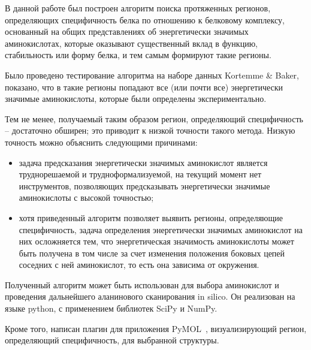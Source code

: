 \conclusion
В данной работе был построен алгоритм поиска протяженных регионов, определяющих специфичность белка по отношению к белковому комплексу, основанный на общих представлениях об энергетически значимых аминокислотах, которые оказывают существенный вклад в функцию, стабильность или форму белка, и тем самым формируют такие регионы. 

Было проведено тестирование алгоритма на наборе данных Kortemme \& Baker, показано, что в такие регионы попадают все (или почти все) энергетически значимые аминокислоты, которые были определены экспериментально.

Тем не менее, получаемый таким образом регион, определяющий специфичность -- достаточно обширен; это приводит к низкой  точности такого метода. Низкую точность можно объяснить следующими причинами:
\begin{itemize}
\item задача предсказания энергетически значимых аминокислот является труднорешаемой и трудноформализуемой, на текущий момент нет  инструментов, позволяющих предсказывать энергетически значимые аминокислоты с высокой точностью; 
\item хотя приведенный алгоритм позволяет выявить регионы, определяющие специфичность, задача определения энергетически значимых аминокислот на них  осложняется тем, что энергетическая значимость аминокислоты может быть получена в том числе за счет изменения положения боковых цепей соседних с ней аминокислот, то есть она зависима от окружения.
\end{itemize}

Полученный алгоритм может быть использован  для выбора аминокислот и проведения дальнейшего аланинового сканирования in silico. Он реализован на языке python, с применением библиотек SciPy\cite{scipy} и NumPy\cite{numpy}.

Кроме того, написан плагин для приложения PyMOL~\cite{pymol}, визуализирующий регион, определяющий специфичность, для выбранной структуры.

